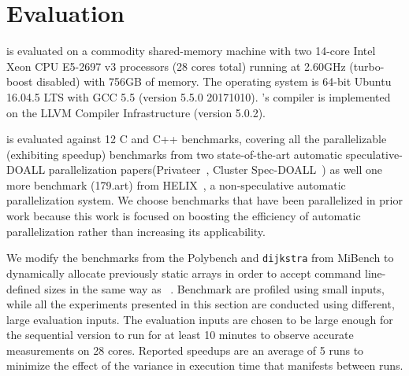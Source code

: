 \section{Evaluation}
\label{eval}
\name is evaluated on a commodity shared-memory machine with two 14-core
Intel Xeon CPU E5-2697 v3 processors (28 cores total) running at 2.60GHz
(turbo-boost disabled) with 756GB of memory. The operating system is
64-bit Ubuntu 16.04.5 LTS with GCC 5.5 (version 5.5.0 20171010).
\namensp's compiler is implemented on the LLVM Compiler Infrastructure
(version 5.0.2)\cite{LLVM:CGO04}.


\name is evaluated against 12 C and C++ benchmarks, covering all the
parallelizable (exhibiting speedup) benchmarks from two
state-of-the-art automatic speculative-DOALL parallelization
papers(Privateer~\cite{johnson:12:pldi}, Cluster
Spec-DOALL~\cite{kim:12:cgo}) as well one more benchmark
(179.art) from HELIX~\cite{simone:12:cgo}, a non-speculative automatic
parallelization system.
We choose benchmarks that have been parallelized in prior work because this
work is focused on boosting the efficiency of automatic parallelization
rather than increasing its applicability.

We modify the benchmarks from the Polybench and \texttt{dijkstra} from
MiBench to dynamically allocate previously static arrays in order to accept
command line-defined sizes in the same way as ~\cite{johnson:12:pldi, kim:12:cgo}.
%
%
Benchmark are profiled using small inputs, while all the
experiments presented in this section are conducted using different,
large evaluation inputs. The evaluation inputs are chosen to be large
enough for the sequential version to run for at least 10 minutes to
observe accurate measurements on 28 cores. Reported speedups are an average
of 5 runs to minimize the effect of the variance in execution time that
manifests between runs.


